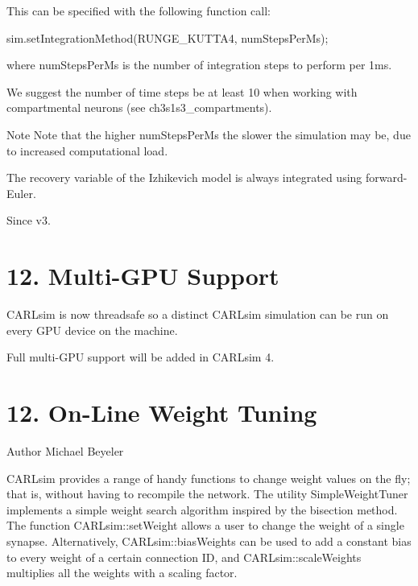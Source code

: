 This can be specified with the following function call\+:


\begin{DoxyCode}
sim.setIntegrationMethod(RUNGE\_KUTTA4, numStepsPerMs);
\end{DoxyCode}


where {\ttfamily num\+Steps\+Per\+Ms} is the number of integration steps to perform per 1ms.

We suggest the number of time steps be at least 10 when working with compartmental neurons (see ch3s1s3\+\_\+compartments).

\begin{DoxyNote}{Note}
Note that the higher num\+Steps\+Per\+Ms the slower the simulation may be, due to increased computational load. 

The recovery variable of the Izhikevich model is always integrated using forward-\/\+Euler. 
\end{DoxyNote}
\begin{DoxySince}{Since}
v3.
\end{DoxySince}
\hypertarget{ch12_advanced_topics_ch12s3_multi_gpu}{}\section{12. Multi-\/\+G\+P\+U Support}\label{ch12_advanced_topics_ch12s3_multi_gpu}
C\+A\+R\+Lsim is now threadsafe so a distinct C\+A\+R\+Lsim simulation can be run on every G\+PU device on the machine.

Full multi-\/\+G\+PU support will be added in C\+A\+R\+Lsim 4.\hypertarget{ch12_advanced_topics_ch12s4_online_weight_tuning}{}\section{12. On-\/\+Line Weight Tuning}\label{ch12_advanced_topics_ch12s4_online_weight_tuning}
\begin{DoxyAuthor}{Author}
Michael Beyeler
\end{DoxyAuthor}
C\+A\+R\+Lsim provides a range of handy functions to change weight values on the fly; that is, without having to recompile the network. The utility Simple\+Weight\+Tuner implements a simple weight search algorithm inspired by the bisection method. The function C\+A\+R\+Lsim\+::set\+Weight allows a user to change the weight of a single synapse. Alternatively, C\+A\+R\+Lsim\+::bias\+Weights can be used to add a constant bias to every weight of a certain connection ID, and C\+A\+R\+Lsim\+::scale\+Weights multiplies all the weights with a scaling factor.


